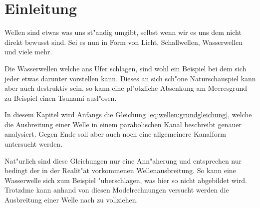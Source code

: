 \section{Einleitung}
Wellen sind etwas was uns st"andig umgibt, selbst wenn wir es uns dem nicht 
direkt bewusst sind. Sei es nun in Form von Licht, Schallwellen, Wasserwellen 
und viele mehr.

Die Wasserwellen welche ans Ufer schlagen, sind wohl ein Beispiel bei dem sich 
jeder etwas darunter vorstellen kann. Dieses an sich sch"one Naturschauspiel 
kann aber auch destruktiv sein, so kann eine pl"otzliche Absenkung am 
Meeresgrund zu Beispiel einen Tsunami ausl"osen.

In diesem Kapitel wird Anfangs die Gleichung \ref{eq:wellen:grundgleichung}, 
welche die Ausbreitung einer Welle in einem parabolischen Kanal beschreibt 
genauer analysiert. Gegen Ende soll aber auch noch eine allgemeinere Kanalform 
untersucht werden.

Nat"urlich sind diese Gleichungen nur eine Ann"aherung und entsprechen nur 
bedingt der in der Realit"at vorkommenen Wellenausbreitung. So kann eine 
Wasserwelle sich zum Beispiel "uberschlagen, was hier so nicht abgebildet wird. 
Trotzdme kann anhand von diesen Modelrechnungen versucht werden die Ausbreitung 
einer Welle nach zu vollziehen.